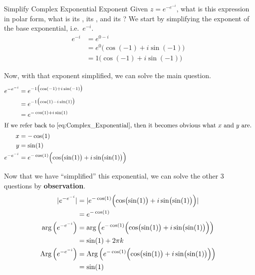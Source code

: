 \begin{example}[Lecture 3]{Simplify Complex Exponential Exponent}
  Given $z = e^{-e^{-i}}$, what is this expression in polar form, what is its , its , and its ?
  \tcblower{}
  We start by simplifying the exponent of the base exponential, i.e.\ $e^{-i}$.
  \begin{align*}
    e^{-i} &= e^{0 - i} \\
           &= e^{0} \bigl( \cos(-1) + i \sin(-1) \bigr) \\
           &= 1 \bigl( \cos(-1) + i \sin(-1) \bigr)
  \end{align*}

  Now, with that exponent simplified, we can solve the main question.
  \begin{align*}
    e^{-e^{-i}} &= e^{-1 \bigl( \cos(-1) + i \sin(-1) \bigr)} \\
                &= e^{-1 \bigl( \cos(1) - i \sin(1) \bigr)} \\
    &= e^{-\cos(1) + i \sin(1)} \\
    \intertext{If we refer back to \Cref{eq:Complex_Exponential}, then it becomes obvious what $x$ and $y$ are.}
    x &= -\cos(1) \\
    y &= \sin(1) \\
    e^{-e^{-i}} &= e^{-\cos(1)} \Bigl( \cos \bigl( \sin(1) \bigr) + i \sin \bigl( \sin(1) \bigr) \Bigr)
  \end{align*}

  Now that we have ``simplified'' this exponential, we can solve the other 3 questions by \textbf{observation}.
  \begin{align*}
    \lvert e^{-e^{-i}} \rvert &= \lvert e^{-\cos(1)} \Bigl( \cos \bigl( \sin(1) \bigr) + i \sin \bigl( \sin(1) \bigr) \Bigr) \rvert \\
                          &= e^{-\cos(1)} \\
    \arg \left( e^{-e^{-i}} \right) &= \arg \left( e^{-\cos(1)} \Bigl( \cos \bigl( \sin(1) \bigr) + i \sin \bigl( \sin(1) \bigr) \Bigr) \right) \\
                          &= \sin(1) + 2 \pi k \\
    \operatorname{Arg} \left( e^{-e^{-i}} \right) &= \operatorname{Arg} \left( e^{-\cos(1)} \Bigl( \cos \bigl( \sin(1) \bigr) + i \sin \bigl( \sin(1) \bigr) \Bigr) \right) \\
                          &= \sin(1)
  \end{align*}
\end{example}


